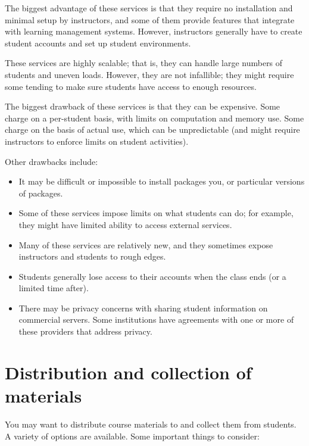 \documentclass[]{book}
\begin{document}
The biggest advantage of these services is that they require no
installation and minimal setup by instructors, and some of them provide
features that integrate with learning management systems. However,
instructors generally have to create student accounts and set up student
environments.

These services are highly scalable; that is, they can handle large
numbers of students and uneven loads. However, they are not infallible;
they might require some tending to make sure students have access to
enough resources.

The biggest drawback of these services is that they can be expensive.
Some charge on a per-student basis, with limits on computation and
memory use. Some charge on the basis of actual use, which can be
unpredictable (and might require instructors to enforce limits on
student activities).

Other drawbacks include:

\begin{itemize}
\item
  It may be difficult or impossible to install packages you, or
  particular versions of packages.
\item
  Some of these services impose limits on what students can do; for
  example, they might have limited ability to access external services.
\item
  Many of these services are relatively new, and they sometimes expose
  instructors and students to rough edges.
\item
  Students generally lose access to their accounts when the class ends
  (or a limited time after).
\item
  There may be privacy concerns with sharing student information on
  commercial servers. Some institutions have agreements with one or more
  of these providers that address privacy.
\end{itemize}

\section{Distribution and collection of
materials}\label{distribution-and-collection-of-materials}

You may want to distribute course materials to and collect them from
students. A variety of options are available. Some important things to
consider:
\end{document}
